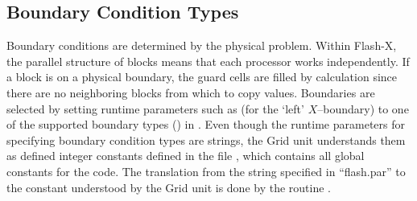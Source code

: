 \subsection{Boundary Condition Types}
Boundary conditions %
are determined by the physical problem.
Within Flash-X, the parallel structure of blocks means that each
processor works independently. If a block is on a physical boundary,
the  guard cells are filled by calculation
since there are no neighboring blocks from which to copy
values. Boundaries are selected by setting runtime parameters such as
 (for the `left' $X$--boundary) to
one of the supported boundary types () in
. Even though the runtime parameters for specifying
boundary condition types are strings, the \unit{Grid} unit understands them as
defined integer constants defined in the file
, which contains all global constants for
the code. The translation from the string specified in
``flash.par'' to the constant understood by the \unit{Grid} unit is done by the
routine .

